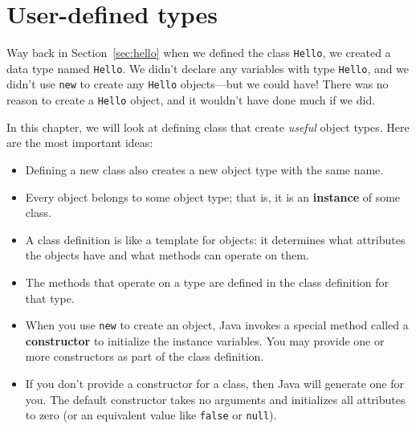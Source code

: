 \documentclass[12pt]{book}
\title{\thetitle}
\author{\theauthors}
\date{\theversion}
\theoremstyle{exercise}
\newcommand{\java}[1]{\lstinline{#1}} %
\begin{document}
\setcounter{chapter}{9}


\chapter{User-defined types}


Way back in Section~\ref{sec:hello} when we defined the class \java{Hello}, we created a data type named \java{Hello}.
We didn't declare any variables with type \java{Hello}, and we didn't use \java{new} to create any \java{Hello} objects---but we could have!
There was no reason to create a \java{Hello} object, and it wouldn't have done much if we did.


In this chapter, we will look at defining class that create {\em useful} object types.
Here are the most important ideas:

\begin{itemize}

\item Defining a new class also creates a new object type with the same name.


\item Every object belongs to some object type; that is, it is an {\bf instance} of some class.

\item A class definition is like a template for objects: it determines what attributes the objects have and what methods can operate on them.

\item The methods that operate on a type are defined in the class definition for that type.


\item When you use \java{new} to create an object, Java invokes a special method called a {\bf constructor} to initialize the instance variables.
You may provide one or more constructors as part of the class definition.

\item If you don't provide a constructor for a class, then Java will generate one for you.
The default constructor takes no arguments and initializes all attributes to zero (or an equivalent value like \java{false} or \java{null}).

\end{itemize}
\end{document}
